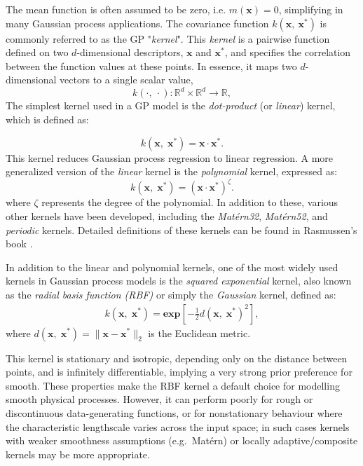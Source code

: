 The mean function is often assumed to be zero, i.e. $m(\textbf{x}) = 0$, simplifying in many Gaussian process applications.
The covariance function $k(\textbf{x},\:\textbf{x}^{*})$ is commonly referred to as the GP "\textit{kernel}".
This \textit{kernel} is a pairwise function defined on two $d$-dimensional descriptors, $\mathbf{x}$ and $\mathbf{x}^{*}$, and specifies the correlation between the function values at these points.
In essence, it maps two $d$-dimensional vectors to a single scalar value, 
\[k(\cdot,\:\cdot):\mathbb{R}^{d}\times\mathbb{R}^{d}\rightarrow\mathbb{R},\]
The simplest kernel used in a GP model is the \textit{dot-product} (or \textit{linear}) kernel, which is defined as:

\begin{equation} \label{equ:2.30}
k(\mathbf{x},\;\mathbf{x}^{\ast}) = \mathbf{x} \cdot \mathbf{x}^{\ast}. 
\end{equation}
This kernel reduces Gaussian process regression to linear regression. A more generalized version of the \textit{linear} kernel is the \textit{polynomial} kernel, expressed as:
\begin{equation} \label{equ:2.31}
    k(\mathbf{x},\;\mathbf{x}^{\ast}) = (\mathbf{x} \cdot \mathbf{x}^{\ast})^{\zeta}.
\end{equation}
where $\zeta$ represents the degree of the polynomial.
In addition to these, various other kernels have been developed, including the \textit{Mat\'{e}rn32}, \textit{Mat\'{e}rn52}, and \textit{periodic} kernels.
Detailed definitions of these kernels can be found in Rasmussen's book \cite{RasmussenW06}.

In addition to the linear and polynomial kernels, one of the most widely used kernels in Gaussian process models is the \textit{squared exponential} kernel, also known as the \textit{radial basis function (RBF)} or simply the \textit{Gaussian} kernel, defined as:
\begin{equation} \label{equ:2.32}
        \begin{split}
            k(\mathbf{x},\;\mathbf{x}^{*})= \mathbf{exp}\left[-\frac{1}{2}d(\mathbf{x},\;\mathbf{x}^{*})^{2}\right],
        \end{split}
\end{equation}
where $d(\mathbf{x},\;\mathbf{x}^{*})=\lVert\mathbf{x}-\mathbf{x}^{*}\rVert_{2}$ is the Euclidean metric.

This kernel is stationary and isotropic, depending only on the distance between points, and is infinitely differentiable, implying a very strong prior preference for smooth.
These properties make the RBF kernel a default choice for modelling smooth physical processes. 
However, it can perform poorly for rough or discontinuous data-generating functions, or for nonstationary behaviour where the characteristic lengthscale varies across the input space; in such cases kernels with weaker smoothness assumptions (e.g.\ Matérn) or locally adaptive/composite kernels may be more appropriate.

